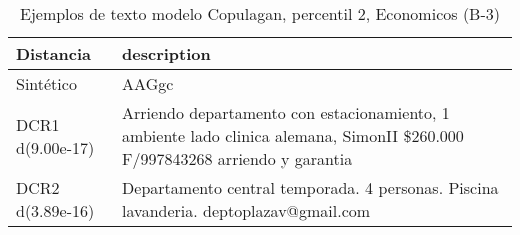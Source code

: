 \begin{table}[H]
\centering
\fontsize{10}{14}\selectfont
\caption{Ejemplos de texto modelo Copulagan, percentil 2, Economicos (B-3)}
\label{table-example-economicos-b-3-copulagan-2p-text}
\begin{tabular}{|l|m{35em}|}
\hline
\rowcolor[gray]{0.8}
Distancia & description \\
\hline Sintético & AAGgc \\
\hline DCR1 d(9.00e-17) & Arriendo departamento con estacionamiento, 1 ambiente lado clinica alemana, SimonII \$260.000 F/997843268 arriendo y garantia \\
\hline DCR2 d(3.89e-16) & Departamento central temporada. 4 personas. Piscina lavanderia.  deptoplazav@gmail.com \\
\hline
\end{tabular}
\end{table}
